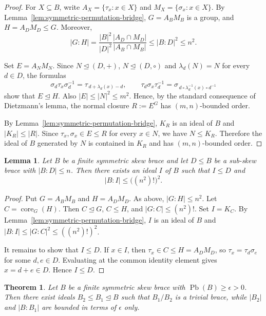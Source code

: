 \documentclass[10pt,a4paper]{amsart}
\numberwithin{equation}{section}
\newtheorem{lem}[equation]{Lemma}
\newtheorem{thm}[equation]{Theorem}
\newcommand{\Pb}{\operatorname{Pb} }
\begin{document}
\begin{proof}
For $X\subseteq B$, write $A_X=\{\tau_x:x\in X\}$ and $M_X=\{\sigma_x:x\in X\}$. By Lemma~\ref{lem:symmetric-permutation-bridge}, $G=A_BM_B$ is a group, and $H=A_DM_D\leqslant G$. Moreover,
$$
|G:H|=\frac{|B|^2}{|D|^2}\frac{|A_D\cap M_D|}{|A_B\cap M_B|}\leqslant |B:D|^2\leqslant n^2.
$$

Set $E=A_NM_N$. Since $N\unlhd(D,+)$, $N\unlhd(D,\circ)$ and $\lambda_d(N)=N$ for every $d\in D$, the formulas
$$
\sigma_d\tau_x\sigma_d^{-1}=\tau_{\,d+\lambda_d(x)-d},\qquad
\tau_d\sigma_x\tau_d^{-1}=\sigma_{\,d\circ\lambda_d^{-1}(x)\circ d^{-1}}
$$
show that $E\unlhd H$. Also $|E|\leqslant |N|^2\leqslant m^2$. Hence, by the standard consequence of Dietzmann's lemma, the normal closure $R:=E^G$ has $(m,n)$-bounded order.

By Lemma~\ref{lem:symmetric-permutation-bridge}, $K_R$ is an ideal of $B$ and $|K_R|\leqslant |R|$. Since $\tau_x,\sigma_x\in E\leqslant R$ for every $x\in N$, we have $N\leqslant K_R$. Therefore the ideal of $B$ generated by $N$ is contained in $K_R$ and has $(m,n)$-bounded order.
\end{proof}

\begin{lem}\label{lem:finite-index-ideal-core-symmetric}
Let $B$ be a finite symmetric skew brace and let $D\leqslant B$ be a sub-skew brace with $|B:D|\leqslant n$. Then there exists an ideal $I$ of $B$ such that $I\leqslant D$ and
$$
|B:I|\leqslant \big((n^2)!\big)^2.
$$
\end{lem}

\begin{proof}
Put $G=A_BM_B$ and $H=A_DM_D$. As above, $|G:H|\leqslant n^2$. Let $C=\operatorname{core}_G(H)$. Then $C\unlhd G$, $C\leqslant H$, and $|G:C|\leqslant (n^2)!$. Set $I=K_C$. By Lemma~\ref{lem:symmetric-permutation-bridge}, $I$ is an ideal of $B$ and $|B:I|\leqslant |G:C|^2\leqslant((n^2)!)^2$.

It remains to show that $I\leqslant D$. If $x\in I$, then $\tau_x\in C\leqslant H=A_DM_D$, so $\tau_x=\tau_d\sigma_e$ for some $d,e\in D$. Evaluating at the common identity element gives $x=d+e\in D$. Hence $I\leqslant D$.
\end{proof}

\begin{thm}\label{thm:bfc-ideals-symmetric}
Let $B$ be a finite symmetric skew brace with $\Pb(B)\geqslant\epsilon>0$. Then there exist ideals $B_2\leqslant B_1\trianglelefteq B$ such that $B_1/B_2$ is a trivial brace, while $|B_2|$ and $|B:B_1|$ are bounded in terms of $\epsilon$ only.
\end{thm}
\end{document}
